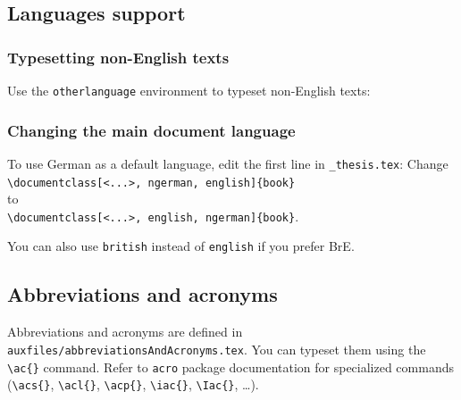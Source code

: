 


\subsection{Languages support}
\subsubsection{Typesetting non-English texts}
Use the \verb|otherlanguage| environment to typeset non-English texts:
\begin{center}
\end{center}

\subsubsection{Changing the main document language}
\label{sc:changingMainDocumentLanguage}
To use German as a default language, edit the first line in \verb|_thesis.tex|:
Change\\
\verb|\documentclass[<...>, ngerman, english]{book}|\\
to\\
\verb|\documentclass[<...>, english, ngerman]{book}|.

You can also use \verb|british| instead of \verb|english| if you prefer BrE.


\subsection{Abbreviations and acronyms}
Abbreviations and acronyms are defined in \verb|auxfiles/abbreviationsAndAcronyms.tex|.
You can typeset them using the \verb|\ac{}| command. Refer to \texttt{acro} package
documentation for specialized commands (\verb|\acs{}|, \verb|\acl{}|, \verb|\acp{}|,
\verb|\iac{}|, \verb|\Iac{}|, \ldots).

